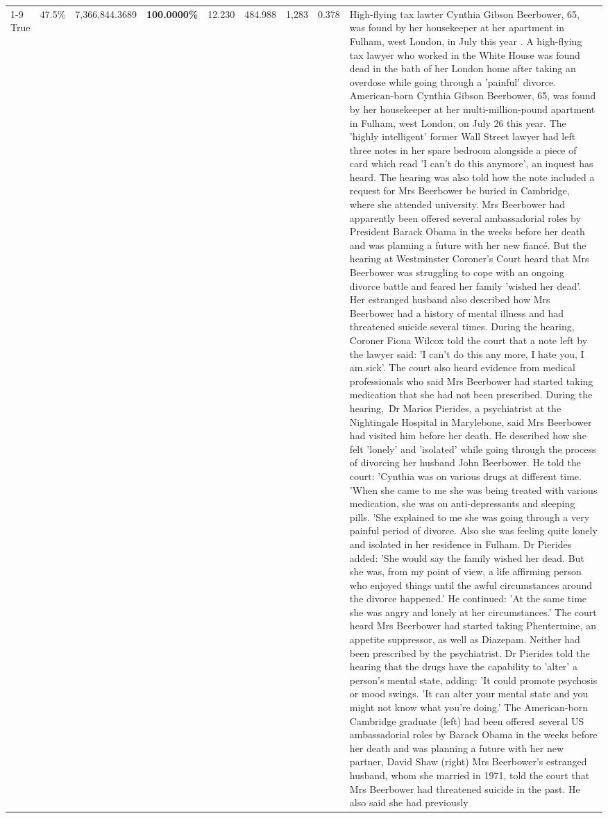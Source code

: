 \begin{table}[H]
\begin{tabular}{lllrlllll}
\cline{1-9}
True & 47.5\% & 7,366,844.3689 & \bfseries \color{red} 100.0000\% & 12.230 & 484.988 & 1,283 & 0.378 & High-flying tax lawter Cynthia Gibson Beerbower, 65, was found by her housekeeper at her apartment in Fulham, west London, in July this year . A high-flying tax lawyer who worked in the White House was found dead in the bath of her London home after taking an overdose while going through a 'painful' divorce. American-born Cynthia Gibson Beerbower, 65, was found by her housekeeper at her multi-million-pound apartment in Fulham, west London, on July 26 this year. The 'highly intelligent' former Wall Street lawyer had left three notes in her spare bedroom alongside a piece of card which read 'I can't do this anymore', an inquest has heard. The hearing was also told how the note included a request for Mrs Beerbower be buried in Cambridge, where she attended university. Mrs Beerbower had apparently been offered several ambassadorial roles by President Barack Obama in the weeks before her death and was planning a future with her new fiancé. But the hearing at Westminster Coroner's Court heard that Mrs Beerbower was struggling to cope with an ongoing divorce battle and feared her family 'wished her dead'. Her estranged husband also described how Mrs Beerbower had a history of mental illness and had threatened suicide several times. During the hearing, Coroner Fiona Wilcox told the court that a note left by the lawyer said: 'I can't do this any more, I hate you, I am sick'. The court also heard evidence from medical professionals who said Mrs Beerbower had started taking medication that she had not been prescribed. During the hearing, Dr Marios Pierides, a psychiatrist at the Nightingale Hospital in Marylebone, said Mrs Beerbower had visited him before her death. He described how she felt 'lonely' and 'isolated' while going through the process of divorcing her husband John Beerbower. He told the court: 'Cynthia was on various drugs at different time. 'When she came to me she was being treated with various medication, she was on anti-depressants and sleeping pills. 'She explained to me she was going through a very painful period of divorce. Also she was feeling quite lonely and isolated in her residence in Fulham. Dr Pierides added: 'She would say the family wished her dead. But she was, from my point of view, a life affirming person who enjoyed things until the awful circumstances around the divorce happened.' He continued: 'At the same time she was angry and lonely at her circumstances.' The court heard Mrs Beerbower had started taking Phentermine, an appetite suppressor, as well as Diazepam. Neither had been prescribed by the psychiatrist. Dr Pierides told the hearing that the drugs have the capability to 'alter' a person's mental state, adding: 'It could promote psychosis or mood swings. 'It can alter your mental state and you might not know what you're doing.' The American-born Cambridge graduate (left) had been offered several US ambassadorial roles by Barack Obama in the weeks before her death and was planning a future with her new partner, David Shaw (right) Mrs Beerbower's estranged husband, whom she married in 1971, told the court that Mrs Beerbower had threatened suicide in the past. He also said she had previously 
\end{tabular}
\end{table}
